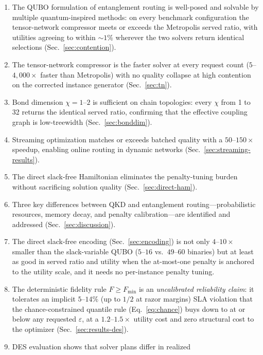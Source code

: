 \documentclass[10pt,a4paper]{article}
\begin{document}
\begin{enumerate}
  \item The QUBO formulation of entanglement routing is well-posed
    and solvable by multiple quantum-inspired methods: on every
    benchmark configuration the tensor-network compressor meets or
exceeds the Metropolis served ratio, with utilities agreeing to
within $\sim\!1\%$ wherever the two solvers return identical
selections (Sec.~\ref{sec:contention}).
  \item The tensor-network compressor is the faster solver at every
    request count ($5$--$4{,}000\times$ faster than Metropolis) with no
    quality collapse at high contention on the corrected instance
    generator (Sec.~\ref{sec:tn}).
  \item Bond dimension $\chi = 1$--$2$ is sufficient on chain
    topologies: every $\chi$ from 1 to 32 returns the identical served
    ratio, confirming that the effective coupling graph is
    low-treewidth (Sec.~\ref{sec:bonddim}).
  \item Streaming optimization matches or exceeds batched quality with
    a $50$--$150\times$ speedup, enabling online routing in dynamic
    networks (Sec.~\ref{sec:streaming-results}).
  \item The direct slack-free Hamiltonian eliminates the
    penalty-tuning burden without sacrificing solution quality
    (Sec.~\ref{sec:direct-ham}).
  \item Three key differences between QKD and entanglement
    routing---probabilistic resources, memory decay, and penalty
    calibration---are identified and addressed
    (Sec.~\ref{sec:discussion}).
  \item The direct slack-free encoding (Sec.~\ref{sec:encoding})
    is not only $4$--$10\times$ smaller than the slack-variable QUBO
    ($5$--$16$ vs.\ $49$--$60$ binaries) but at least as good in
    served ratio and utility when the at-most-one penalty is anchored
    to the utility scale, and it needs no per-instance penalty tuning.
  \item The deterministic fidelity rule $F \ge F_{\min}$ is an
    \emph{uncalibrated reliability claim}: it tolerates an implicit
    $5$--$14\%$ (up to $1/2$ at razor margins) SLA violation that the
    chance-constrained quantile rule (Eq.~\eqref{eq:chance}) buys down
    to at or below any requested $\varepsilon$, at a $1.2$--$1.5\times$
    utility cost and zero structural cost to the optimizer
    (Sec.~\ref{sec:results-des}).
  \item DES evaluation shows that solver plans differ in realized

\end{enumerate}
\end{document}
